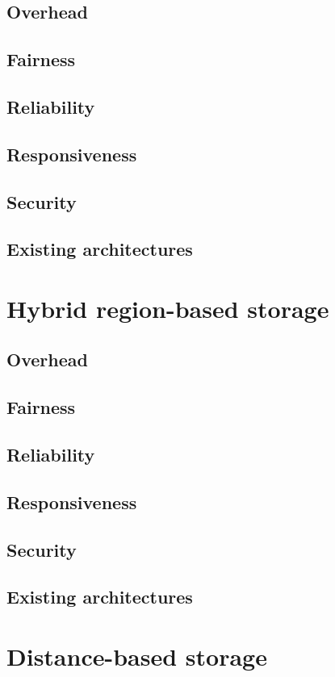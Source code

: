         \subsection{Overhead}
        \subsection{Fairness}
        \subsection{Reliability}
        \subsection{Responsiveness}
        \subsection{Security}
        \subsection{Existing architectures}
    \section{Hybrid region-based storage}
        \subsection{Overhead}
        \subsection{Fairness}
        \subsection{Reliability}
        \subsection{Responsiveness}
        \subsection{Security}
        \subsection{Existing architectures}
    \section{Distance-based storage}
